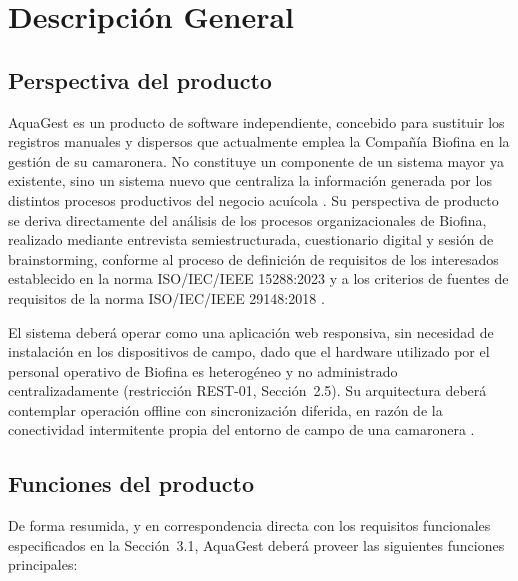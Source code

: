 \documentclass[12pt,a4paper]{article}
\begin{document}
\section{Descripción General}

\subsection{Perspectiva del producto}

AquaGest es un producto de software independiente, concebido para sustituir los
registros manuales y dispersos que actualmente emplea la Compañía Biofina en la
gestión de su camaronera. No constituye un componente de un sistema mayor ya
existente, sino un sistema nuevo que centraliza la información generada por los
distintos procesos productivos del negocio acuícola \cite{ISO15288:2023}. Su
perspectiva de producto se deriva directamente del análisis de los procesos
organizacionales de Biofina, realizado mediante entrevista semiestructurada,
cuestionario digital y sesión de brainstorming, conforme al proceso de
definición de requisitos de los interesados establecido en la norma
ISO/IEC/IEEE 15288:2023 \cite{ISO15288:2023} y a los criterios de fuentes de
requisitos de la norma ISO/IEC/IEEE 29148:2018 \cite{ISO29148:2018}.

El sistema deberá operar como una aplicación web responsiva, sin necesidad de
instalación en los dispositivos de campo, dado que el hardware utilizado por el
personal operativo de Biofina es heterogéneo y no administrado centralizadamente
(restricción REST-01, Sección~2.5). Su arquitectura deberá contemplar operación
offline con sincronización diferida, en razón de la conectividad intermitente
propia del entorno de campo de una camaronera \cite{Pohl2010}.

\subsection{Funciones del producto}

De forma resumida, y en correspondencia directa con los requisitos funcionales
especificados en la Sección~3.1, AquaGest deberá proveer las siguientes
funciones principales:
\end{document}
